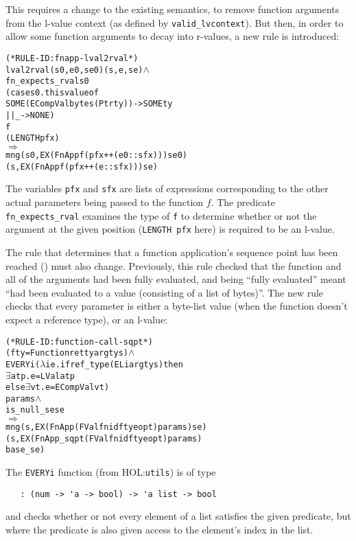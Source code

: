 \documentclass[11pt]{article}
\newcommand{\HOLfile}[1]{HOL:\texttt{#1}}
\begin{document}
This requires a change to the existing semantics, to remove function
arguments from the l-value context (as defined by
\texttt{valid_lvcontext}).
But then, in order to allow some function arguments to decay into
r-values, a new rule is introduced:
\begin{center}
\begin{minipage}{\textwidth}
%
\begin{alltt}
(* RULE-ID: fnapp-lval2rval *)
     lval2rval (s0,e0,se0) (s,e,se) \(\land\)
     fn_expects_rval s0
       (case s0.thisvalue of
           SOME (ECompVal bytes (Ptr ty)) -> SOME ty
        || _ -> NONE)
       f
       (LENGTH pfx)
   \(\Rightarrow\)
     mng (s0, EX (FnApp f (pfx ++ (e0 :: sfx))) se0)
         (s, EX (FnApp f (pfx ++ (e :: sfx))) se)
\end{alltt}
\end{minipage}
\end{center}
The variables \texttt{pfx} and \texttt{sfx} are lists of expressions
corresponding to the other actual parameters being passed to the
function $f$.  The predicate \texttt{fn_expects_rval} examines the
type of \texttt{f} to determine whether or not the argument at the
given position (\texttt{LENGTH~pfx} here) is required to be an l-value.

The rule that determines that a function application's sequence point
has been reached () must also change.
Previously, this rule checked that the function and all of the
arguments had been fully evaluated, and being ``fully evaluated''
meant ``had been evaluated to a value (consisting of a list of
bytes)''.  The new rule checks that every parameter is either a
byte-list value (when the function doesn't expect a reference type),
or an l-value:
\begin{center}
\begin{minipage}{\textwidth}
%
\begin{alltt}
(* RULE-ID: function-call-sqpt *)
     (fty = Function retty argtys) \(\land\)
     EVERYi (\(\lambda\)i e. if ref_type (EL i argtys) then
                     \(\exists\)a t p. e = LVal a t p
                   else \(\exists\)v t. e = ECompVal v t)
            params \(\land\)
     is_null_se se
   \(\Rightarrow\)
     mng (s, EX (FnApp (FVal fnid fty eopt) params) se)
         (s, EX (FnApp_sqpt (FVal fnid fty eopt) params)
                base_se)
\end{alltt}
\end{minipage}
\end{center}
The \texttt{EVERYi} function (from \HOLfile{utils}) is of type
\begin{verbatim}
   : (num -> 'a -> bool) -> 'a list -> bool
\end{verbatim}
and checks whether or not every element of a list satisfies the given
predicate, but where the predicate is also given access to the
element's index in the list.
\end{document}
